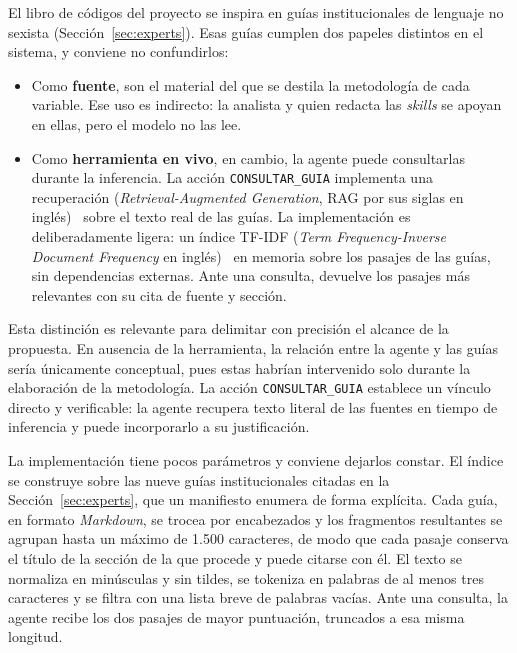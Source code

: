 
El libro de códigos del proyecto se inspira en guías institucionales de lenguaje no
sexista (Sección~\ref{sec:experts}). Esas guías cumplen dos papeles distintos en
el sistema, y conviene no confundirlos:

\begin{itemize}
    \item Como \textbf{fuente}, son el material del que se destila la metodología de cada
variable. Ese uso es indirecto: la analista y quien redacta las \textit{skills} se apoyan
en ellas, pero el modelo no las lee.

\item Como \textbf{herramienta en vivo}, en cambio, la agente puede consultarlas
durante la inferencia. La acción \texttt{CONSULTAR\_GUIA} implementa una
recuperación (\textit{Retrieval-Augmented Generation}, RAG por sus siglas en inglés)~\cite{lewis2020rag} sobre el texto real
de las guías. La implementación es deliberadamente ligera: un índice TF-IDF (\textit{Term Frequency-Inverse Document
Frequency} en inglés)~\cite{sparckjones1972} en memoria sobre
los pasajes de las guías, sin dependencias externas. Ante una
consulta, devuelve los pasajes más relevantes con su cita de fuente y sección.
\end{itemize}



Esta distinción es relevante para delimitar con precisión el alcance de la
propuesta. En ausencia de la herramienta, la relación entre la agente y las guías
sería únicamente conceptual, pues estas habrían intervenido solo durante la
elaboración de la metodología. La acción \texttt{CONSULTAR\_GUIA} establece un
vínculo directo y verificable: la agente recupera texto literal de las fuentes en
tiempo de inferencia y puede incorporarlo a su justificación.

La implementación tiene pocos parámetros y conviene dejarlos constar. El índice se
construye sobre las nueve guías institucionales citadas en la
Sección~\ref{sec:experts}, que un manifiesto enumera de forma explícita. Cada guía, en
formato \textit{Markdown}, se trocea por encabezados y los fragmentos resultantes se
agrupan hasta un máximo de 1.500 caracteres, de modo que cada pasaje conserva el título
de la sección de la que procede y puede citarse con él. El texto se normaliza en
minúsculas y sin tildes, se tokeniza en palabras de al menos tres caracteres y se
filtra con una lista breve de palabras vacías. Ante una consulta, la agente recibe los
dos pasajes de mayor puntuación, truncados a esa misma longitud.

